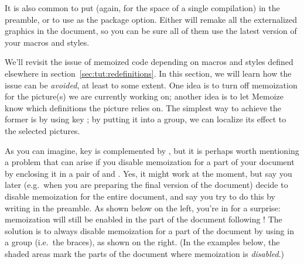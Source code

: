 \documentclass[a4paper,11pt]{article}
\begin{document}

It is also common to put (again, for the space of a single compilation)
 in the preamble, or to use
 as the package option.  Either will remake all the
externalized graphics in the document, so you can be sure all of them use the
latest version of your macros and styles.

We'll revisit the issue of memoized code depending on macros and styles defined
elsewhere in section~\ref{sec:tut:redefinitions}.  In this section, we will
learn how the issue can be \emph{avoided}, at least to some extent.  One idea
is to turn off memoization for the picture(s) we are currently working on;
another idea is to let Memoize know which definitions the picture relies on.
The simplest way to achieve the former is by using key ;
by putting it into a  group, we can localize its effect to the
selected pictures.


\begin{tcolorbox}[warning]
  As you can imagine, key  is complemented by ,
  but it is perhaps worth mentioning a problem that can arise if you disable
  memoization for a part of your document by enclosing it in a pair of
   and
  .  Yes, it might work at the moment,
  but say you later (e.g.\ when you are preparing the final version of the
  document) decide to disable memoization for the entire document, and say you
  try to do this by writing  in the
  preamble.  As shown below on the left, you're in for a surprise: memoization
  will still be enabled in the part of the document following
  !  The solution is to always disable
  memoization for a part of the document by using
   in a  group (i.e.\ the
  braces), as shown on the right.  (In the examples below, the shaded areas
  mark the parts of the document where memoization is \emph{disabled}.)
\end{tcolorbox}
\end{document}
